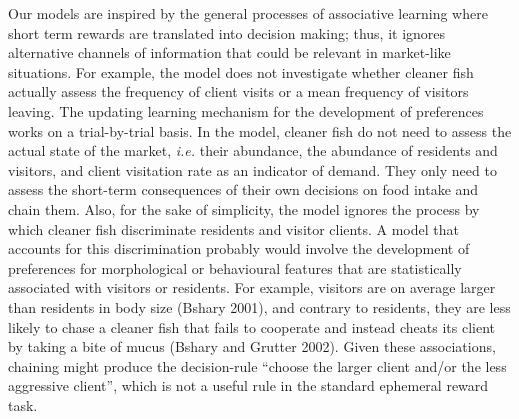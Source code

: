 \documentclass[
  12pt,
]{article}
\begin{document}
Our models are inspired by the general processes of associative learning
where short term rewards are translated into decision making; thus, it
ignores alternative channels of information that could be relevant in
market-like situations. For example, the model does not investigate
whether cleaner fish actually assess the frequency of client visits or a
mean frequency of visitors leaving. The updating learning mechanism for
the development of preferences works on a trial-by-trial basis. In the
model, cleaner fish do not need to assess the actual state of the
market, \emph{i.e.} their abundance, the abundance of residents and
visitors, and client visitation rate as an indicator of demand. They
only need to assess the short-term consequences of their own decisions
on food intake and chain them. Also, for the sake of simplicity, the
model ignores the process by which cleaner fish discriminate residents
and visitor clients. A model that accounts for this discrimination
probably would involve the development of preferences for morphological
or behavioural features that are statistically associated with visitors
or residents. For example, visitors are on average larger than residents
in body size (Bshary 2001), and contrary to residents, they are less
likely to chase a cleaner fish that fails to cooperate and instead
cheats its client by taking a bite of mucus (Bshary and Grutter 2002).
Given these associations, chaining might produce the decision-rule
``choose the larger client and/or the less aggressive client'', which is
not a useful rule in the standard ephemeral reward task.
\end{document}

